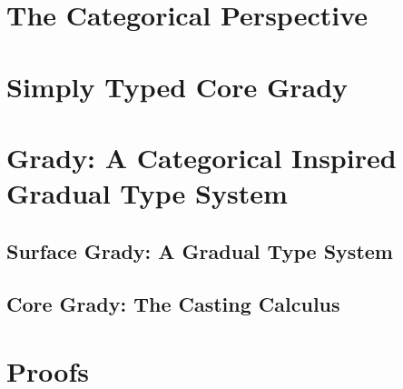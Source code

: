 \documentclass[pacmpl,review,anonymous]{acmart}\settopmatter{printfolios=true}
\begin{document}
\section{The Categorical Perspective}
\label{sec:categorical_perspective}


\section{Simply Typed Core Grady}
\label{sec:sl-grady}


\section{Grady: A Categorical Inspired Gradual Type System}
\label{sec:grady:_a_categorical_inspired_gradual_type_system}

\subsection{Surface Grady: A Gradual Type System}
\label{subsec:surface_grady:_a_gradual_type_system}


\subsection{Core Grady: The Casting Calculus}
\label{subsec:core_grady:_the_casting_calculus}



\nocite{*}


\appendix

\section{Proofs}
\label{sec:proofs}


\end{document}
